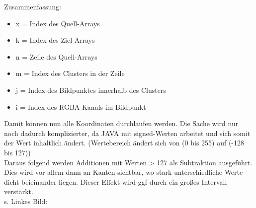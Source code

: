 \begin{description}
\begin{lstlisting}
\end{lstlisting}
Zusammenfassung:
\begin{itemize}
\item x = Index des Quell-Arrays
\item k = Index des Ziel-Arrays
\item n = Zeile des Quell-Arrays
\item m = Index des Clusters in der Zeile
\item j = Index des Bildpunktes innerhalb des Clusters
\item i = Index des RGBA-Kanals im Bildpunkt   
\end{itemize}
Damit können nun alle Koordinaten durchlaufen werden. Die Sache wird nur noch dadurch komplizierter, da JAVA mit signed-Werten arbeitet und sich somit der Wert inhaltlich ändert. (Wertebereich ändert sich von (0 bis 255) auf (-128 bis 127))\\
Daraus folgend werden Additionen mit Werten > 127 als Subtraktion ausgeführt. Dies wird vor allem dann an Kanten sichtbar, wo stark unterschiedliche Werte dicht beieinander liegen. Dieser Effekt wird ggf durch ein großes Intervall verstärkt. 
\\
s. Linkes Bild:


\end{description}
